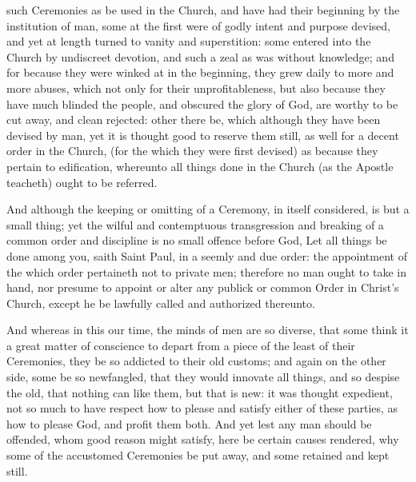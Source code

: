 
 such Ceremonies as be used in the Church, and have had their beginning by the institution of man, some at the first were of godly intent and purpose devised, and yet at length turned to vanity and superstition: some entered into the Church by undiscreet devotion, and such a zeal as was without knowledge; and for because they were winked at in the beginning, they grew daily to more and more abuses, which not only for their unprofitableness, but also because they have much blinded the people, and obscured the glory of God, are worthy to be cut away, and clean rejected: other there be, which although they have been devised by man, yet it is thought good to reserve them still, as well for a decent order in the Church, (for the which they were first devised) as because they pertain to edification, whereunto all things done in the Church (as the Apostle teacheth) ought to be referred.

And although the keeping or omitting of a Ceremony, in itself considered, is but a small thing; yet the wilful and contemptuous transgression and breaking of a common order and discipline is no small offence before God, Let all things be done among you, saith Saint Paul, in a seemly and due order: the appointment of the which order pertaineth not to private men; therefore no man ought to take in hand, nor presume to appoint or alter any publick or common Order in Christ's Church, except he be lawfully called and authorized thereunto.

And whereas in this our time, the minds of men are so diverse, that some think it a great matter of conscience to depart from a piece of the least of their Ceremonies, they be so addicted to their old customs; and again on the other side, some be so newfangled, that they would innovate all things, and so despise the old, that nothing can like them, but that is new: it was thought expedient, not so much to have respect how to please and satisfy either of these parties, as how to please God, and profit them both. And yet lest any man should be offended, whom good reason might satisfy, here be certain causes rendered, why some of the accustomed Ceremonies be put away, and some retained and kept still.

